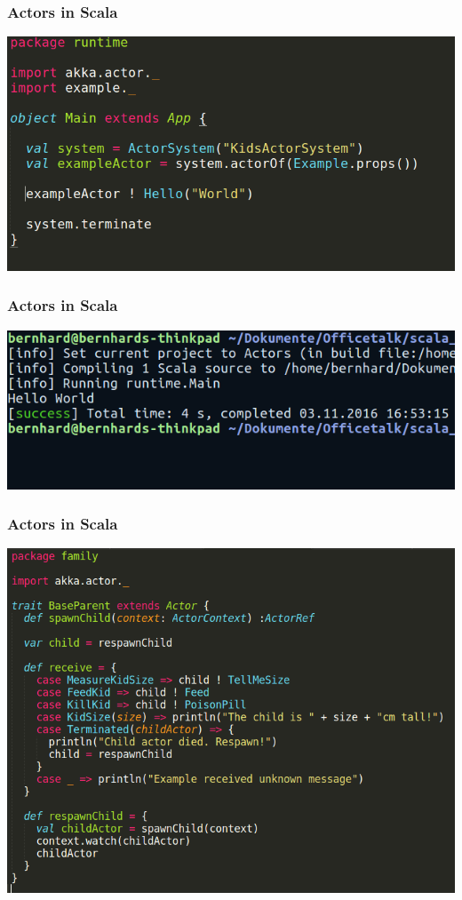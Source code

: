 \documentclass{beamer}
\begin{document}

\begin{frame}
\frametitle{Actors in Scala}
\includegraphics[width=1\linewidth]{./scala_example_main.png}
\end{frame}


\begin{frame}
\frametitle{Actors in Scala}
\includegraphics[width=1\linewidth]{./scala_example_terminal.png}
\end{frame}


\begin{frame}
\frametitle{Actors in Scala}
\includegraphics[width=0.8\linewidth]{./parent_trait.png}
\end{frame}
\end{document}
